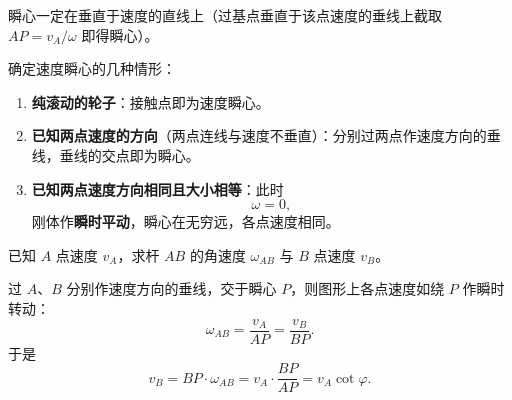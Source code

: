 \begin{keybox}
瞬心一定在垂直于速度的直线上（过基点垂直于该点速度的垂线上截取 $AP=v_A/\omega$ 即得瞬心）。
\end{keybox}


确定速度瞬心的几种情形：
\begin{enumerate}
  \item \textbf{纯滚动的轮子}：接触点即为速度瞬心。
  \item \textbf{已知两点速度的方向}（两点连线与速度不垂直）：分别过两点作速度方向的垂线，垂线的交点即为瞬心。
  \item \textbf{已知两点速度方向相同且大小相等}：此时
  \begin{equation}\label{eq:9-ic-omega-zero}
    \omega = 0 ,
  \end{equation}
  刚体作\textbf{瞬时平动}，瞬心在无穷远，各点速度相同。
\end{enumerate}

\begin{center}
\end{center}


\begin{example}[摇杆机构]
已知 $A$ 点速度 $v_A$，求杆 $AB$ 的角速度 $\omega_{AB}$ 与 $B$ 点速度 $v_B$。
\end{example}

\begin{solution}
过 $A$、$B$ 分别作速度方向的垂线，交于瞬心 $P$，则图形上各点速度如绕 $P$ 作瞬时转动：
\begin{equation}\label{eq:9-rocker-w}
  \omega_{AB}=\frac{v_A}{AP}=\frac{v_B}{BP}.
\end{equation}
于是
\begin{equation}\label{eq:9-rocker-vb}
  v_B = BP\cdot\omega_{AB} = v_A\cdot\frac{BP}{AP} = v_A\cot\varphi .
\end{equation}
\end{solution}

